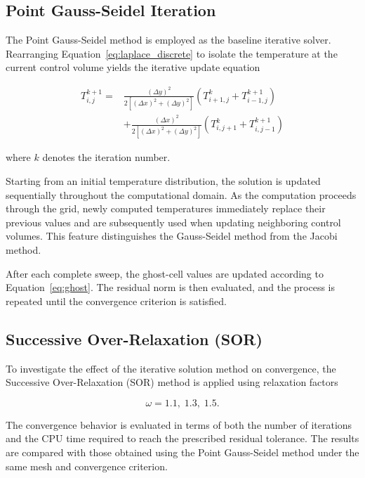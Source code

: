 \subsection{Point Gauss-Seidel Iteration}

The Point Gauss-Seidel method is employed as the baseline iterative solver. Rearranging Equation~\ref{eq:laplace_discrete} to isolate the temperature at the current control volume yields the iterative update equation

\begin{equation}
\begin{aligned}
T_{i,j}^{k+1}
={}&
\frac{(\Delta y)^2}
{2\left[(\Delta x)^2+(\Delta y)^2\right]}
\left(
T_{i+1,j}^{k}
+
T_{i-1,j}^{k+1}
\right)
\\
&+
\frac{(\Delta x)^2}
{2\left[(\Delta x)^2+(\Delta y)^2\right]}
\left(
T_{i,j+1}^{k}
+
T_{i,j-1}^{k+1}
\right)
\end{aligned}
\label{eq:gs}
\end{equation}

where $k$ denotes the iteration number.

Starting from an initial temperature distribution, the solution is updated sequentially throughout the computational domain. As the computation proceeds through the grid, newly computed temperatures immediately replace their previous values and are subsequently used when updating neighboring control volumes. This feature distinguishes the Gauss-Seidel method from the Jacobi method.

After each complete sweep, the ghost-cell values are updated according to Equation~\ref{eq:ghost}. The residual norm is then evaluated, and the process is repeated until the convergence criterion is satisfied.


\subsection{Successive Over-Relaxation (SOR)}

To investigate the effect of the iterative solution method on convergence, the Successive Over-Relaxation (SOR) method is applied using relaxation factors

\[
\omega = 1.1,\;1.3,\;1.5.
\]

The convergence behavior is evaluated in terms of both the number of iterations and the CPU time required to reach the prescribed residual tolerance. The results are compared with those obtained using the Point Gauss-Seidel method under the same mesh and convergence criterion.

